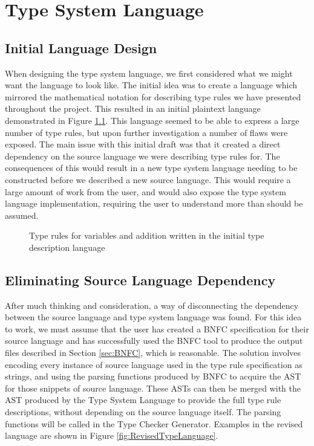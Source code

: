 \documentclass{UoYCSproject}
\begin{document}
\chapter{Type System Language}

\section{Initial Language Design}
When designing the type system language, we first considered what we might
want the language to look like. The initial idea was to create a language which
mirrored the mathematical notation for describing type rules we have presented
throughout the project. This resulted in an initial plaintext language
demonstrated in Figure \ref{fig:InitialTypeLanguage}. This language seemed to
be able to express a large number of type rules, but upon further investigation
a number of flaws were exposed. The main issue with this initial draft was that
it created a direct dependency on the source language we were describing type
rules for. The consequences of this would result in a new type system language
needing to be constructed before we described a new source language. This would
require a large amount of work from the user, and would also expose the type
system language implementation, requiring the user to understand more than
should be assumed.

\begin{figure}
\lstset{basicstyle=\footnotesize\ttfamily, frame=single,
    language=,}

\caption{Type rules for variables and addition written in the initial type
    description language}
\label{fig:InitialTypeLanguage}
\end{figure}

\section{Eliminating Source Language Dependency}
After much thinking and consideration, a way of disconnecting the dependency
between the source language and type system language was found. For this idea
to work, we must assume that the user has created a BNFC specification for their
source language and has successfully used the BNFC tool to produce the output
files described in Section \ref{sec:BNFC}, which is reasonable. The solution
involves encoding every instance of source language used in the type rule
specification as strings, and using the parsing functions produced by BNFC to
acquire the AST for those snippets of source language. These ASTs can then be
merged with the AST produced by the Type System Language to provide the full
type rule descriptions, without depending on the source language itself. The
parsing functions will be called in the Type Checker Generator. Examples in the
revised language are shown in Figure \ref{fig:RevisedTypeLanguage}.
\end{document}
